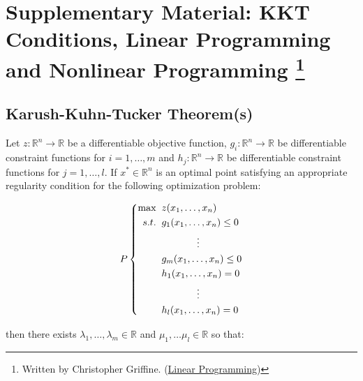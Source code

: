\section[Supplementary Material: KKT Conditions, Linear Programming and Nonlinear Programming]{Supplementary Material: KKT Conditions, Linear Programming and Nonlinear Programming \footnote{Written by Christopher Griffine. (\href{http://www.personal.psu.edu/cxg286/LinearProgramming.html}{Linear Programming})}}



\subsection{Karush-Kuhn-Tucker Theorem(s)}

\begin{theorem} Let $z : \mathbb{R}^n \rightarrow \mathbb{R}$ be a differentiable objective function, $g_i:\mathbb{R}^n \rightarrow \mathbb{R}$ be differentiable constraint functions for $i = 1,\dots,m$ and $h_j:\mathbb{R}^n \rightarrow \mathbb{R}$ be differentiable constraint functions for $j=1,\dots,l$. If ${x}^* \in \mathbb{R}^n$ is an optimal point satisfying an appropriate regularity condition for the following optimization problem:

\begin{displaymath}
P\left\{
\begin{aligned}
\max\;\;& z(x_1,\dots,x_n)\\
s.t.\;\;& g_1(x_1,\dots,x_n) \leq 0\\
& \hspace*{0.5in}\vdots\\
& g_m(x_1,\dots,x_n) \leq 0\\
& h_1(x_1,\dots,x_n) = 0\\
&\hspace*{0.5in}\vdots\\
&h_l(x_1,\dots,x_n) = 0
\end{aligned}
\right.
\end{displaymath}

then there exists $\lambda_1,\dots,\lambda_m \in \mathbb{R}$ and $\mu_1,\dots\mu_l \in \mathbb{R}$ so that:


\end{theorem}
